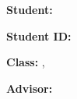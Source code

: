 \begin{thesiscover}
\ThesisCoverHeading
\vspace{12mm}\ThesisCoverProgram
\vspace{12mm}\ThesisCoverTitle
\vfill
\noindent\begin{minipage}[t]{.5\textwidth}\raggedright
\textbf{Student:}\par
\StudentName\par
\textbf{Student ID:} \StudentId\par
\textbf{Class:} \StudentClassCode, \StudentCourse
\end{minipage}\hfill
\begin{minipage}[t]{.46\textwidth}\raggedright
\textbf{Advisor:}\par
\AdvisorName\par
\ifx\AdvisorTwoName\ThesisEmpty\else\AdvisorTwoName\par\fi
\end{minipage}
\vfill
\ThesisCoverFooter
\end{thesiscover}
